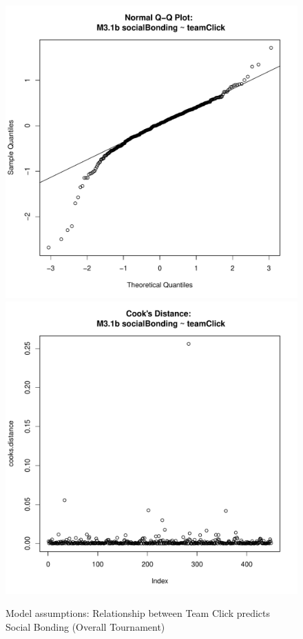 \begin{figure}[htbp]
              \includegraphics[scale =.4]{images/MLM31bQQNorm.pdf}
              \includegraphics[scale =.4]{images/MLM31bCooksD.pdf}
              \caption{Model assumptions: Relationship between Team Click predicts Social Bonding (Overall Tournament)}
              \label{fig:MLM31bAssumptions}
            \end{figure}


